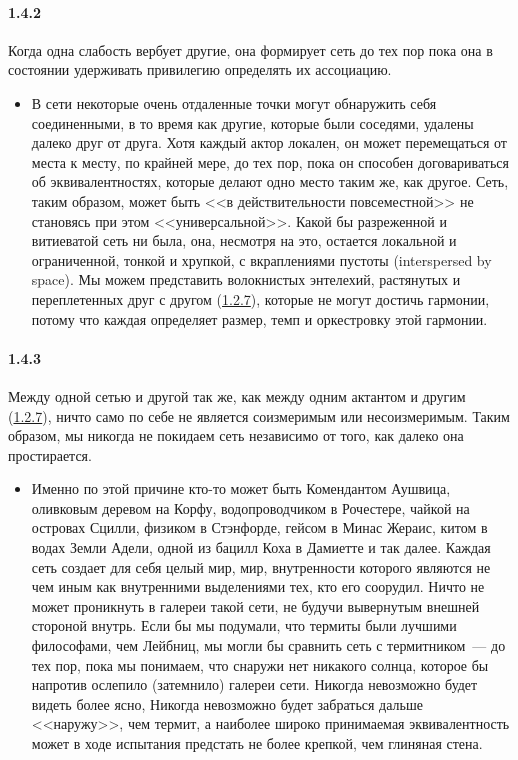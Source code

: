 \paragraph{1.4.2}\hypertarget{par:1.4.2}{} Когда одна слабость вербует другие, она формирует сеть до тех пор пока она в состоянии удерживать привилегию определять их ассоциацию. 
	\begin{itemize}
	\item В сети некоторые очень отдаленные точки могут обнаружить себя соединенными, в то время как другие, которые были соседями, удалены далеко друг от друга. Хотя каждый актор локален, он может перемещаться от места к месту, по крайней мере, до тех пор, пока он способен договариваться об эквивалентностях, которые делают одно место таким же, как другое. Сеть, таким образом, может быть <<в действительности повсеместной>> не становясь при этом <<универсальной>>. Какой бы разреженной и витиеватой сеть ни была, она, несмотря на это, остается локальной и ограниченной, тонкой и хрупкой, с вкраплениями пустоты (interspersed by space). Мы можем представить волокнистых энтелехий, растянутых и переплетенных друг с другом (\hyperlink{par:1.2.7}{1.2.7}), которые не могут достичь гармонии, потому что каждая определяет размер, темп и оркестровку этой гармонии.
	\end{itemize}

\paragraph{1.4.3}\hypertarget{par:1.4.3}{} Между одной сетью и другой так же, как между одним актантом и другим (\hyperlink{par:1.2.7}{1.2.7}), ничто само по себе не является соизмеримым или несоизмеримым. Таким образом, мы никогда не покидаем сеть независимо от того, как далеко она простирается.
	\begin{itemize}
	\item Именно по этой причине кто-то может быть Комендантом Аушвица, оливковым деревом на Корфу, водопроводчиком в Рочестере, чайкой на островах Сцилли, физиком в Стэнфорде, гейсом в Минас Жераис, китом в водах Земли Адели, одной из бацилл Коха в Дамиетте и так далее. Каждая сеть создает для себя целый мир, мир, внутренности которого являются не чем иным как внутренними выделениями тех, кто его соорудил. Ничто не может проникнуть в галереи такой сети, не будучи вывернутым внешней стороной внутрь. Если бы мы подумали, что термиты были лучшими философами, чем Лейбниц, мы могли бы сравнить сеть с термитником~--- до тех пор, пока мы понимаем, что снаружи нет никакого солнца, которое бы напротив ослепило (затемнило) галереи сети. Никогда невозможно будет видеть более ясно, Никогда невозможно будет забраться дальше <<наружу>>, чем термит, а наиболее широко принимаемая эквивалентность может в ходе испытания предстать не более крепкой, чем глиняная стена.
	\end{itemize}


